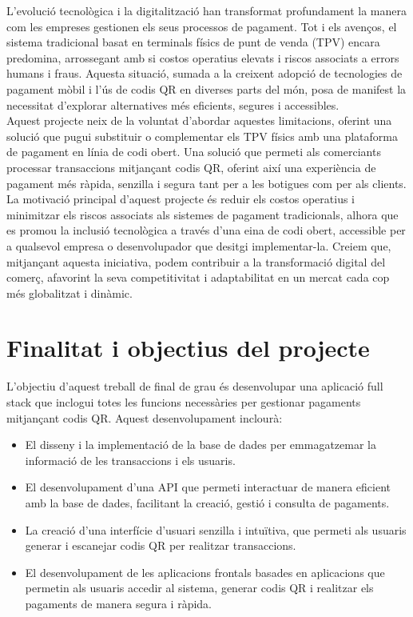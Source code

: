 \documentclass[a4paper,12pt,twoside]{ThesisStyle}
\begin{document}
L’evolució tecnològica i la digitalització han transformat profundament la manera com les empreses gestionen els seus processos de pagament. Tot i els avenços, el sistema tradicional basat en terminals físics de punt de venda (TPV) encara predomina, arrossegant amb si costos operatius elevats i riscos associats a errors humans i fraus. Aquesta situació, sumada a la creixent adopció de tecnologies de pagament mòbil i l’ús de codis QR en diverses parts del món, posa de manifest la necessitat d’explorar alternatives més eficients, segures i accessibles.\\

Aquest projecte neix de la voluntat d’abordar aquestes limitacions, oferint una solució que pugui substituir o complementar els TPV físics amb una plataforma de pagament en línia de codi obert. Una solució que permeti als comerciants processar transaccions mitjançant codis QR, oferint així una experiència de pagament més ràpida, senzilla i segura tant per a les botigues com per als clients.\\

La motivació principal d’aquest projecte és reduir els costos operatius i minimitzar els riscos associats als sistemes de pagament tradicionals, alhora que es promou la inclusió tecnològica a través d’una eina de codi obert, accessible per a qualsevol empresa o desenvolupador que desitgi implementar-la. Creiem que, mitjançant aquesta iniciativa, podem contribuir a la transformació digital del comerç, afavorint la seva competitivitat i adaptabilitat en un mercat cada cop més globalitzat i dinàmic.

\section{Finalitat i objectius del projecte}
\label{sec:Finalitat i objectius del projecte}

L'objectiu d'aquest treball de final de grau és desenvolupar una aplicació full stack que inclogui totes les funcions necessàries per gestionar pagaments mitjançant codis QR. Aquest desenvolupament inclourà:

\begin{itemize}
  \item El disseny i la implementació de la base de dades per emmagatzemar la informació de les transaccions i els usuaris.
  \item El desenvolupament d'una API que permeti interactuar de manera eficient amb la base de dades, facilitant la creació, gestió i consulta de pagaments.
  \item La creació d'una interfície d'usuari senzilla i intuïtiva, que permeti als usuaris generar i escanejar codis QR per realitzar transaccions.
  \item El desenvolupament de les aplicacions frontals basades en aplicacions que permetin als usuaris accedir al sistema, generar codis QR i realitzar els pagaments de manera segura i ràpida.
\end{itemize}
\end{document}
